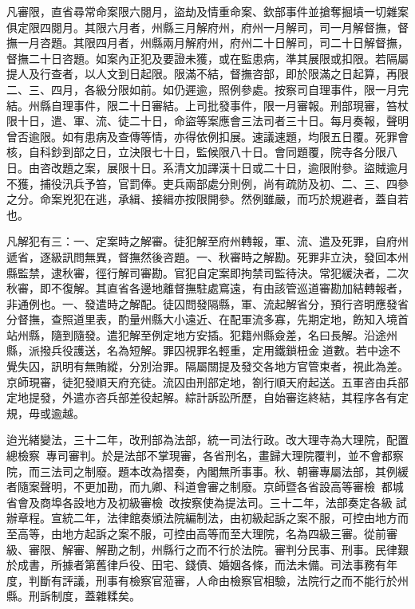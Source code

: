 \begin{pinyinscope}
凡審限，直省尋常命案限六閱月，盜劫及情重命案、欽部事件並搶奪掘墳一切雜案俱定限四閱月。其限六月者，州縣三月解府州，府州一月解司，司一月解督撫，督撫一月咨題。其限四月者，州縣兩月解府州，府州二十日解司，司二十日解督撫，督撫二十日咨題。如案內正犯及要證未獲，或在監患病，準其展限或扣限。若隔屬提人及行查者，以人文到日起限。限滿不結，督撫咨部，即於限滿之日起算，再限二、三、四月，各級分限如前。如仍遲逾，照例參處。按察司自理事件，限一月完結。州縣自理事件，限二十日審結。上司批發事件，限一月審報。刑部現審，笞杖限十日，遣、軍、流、徒二十日，命盜等案應會三法司者三十日。每月奏報，聲明曾否逾限。如有患病及查傳等情，亦得依例扣展。速議速題，均限五日覆。死罪會核，自科鈔到部之日，立決限七十日，監候限八十日。會同題覆，院寺各分限八日。由咨改題之案，展限十日。系清文加譯漢十日或二十日，逾限附參。盜賊逾月不獲，捕役汛兵予笞，官罰俸。吏兵兩部處分則例，尚有疏防及初、二、三、四參之分。命案兇犯在逃，承緝、接緝亦按限開參。然例雖嚴，而巧於規避者，蓋自若也。

凡解犯有三：一、定案時之解審。徒犯解至府州轉報，軍、流、遣及死罪，自府州遞省，逐級訊問無異，督撫然後咨題。一、秋審時之解勘。死罪非立決，發回本州縣監禁，逮秋審，徑行解司審勘。官犯自定案即拘禁司監待決。常犯緩決者，二次秋審，即不復解。其直省各邊地離督撫駐處窵遠，有由該管巡道審勘加結轉報者，非通例也。一、發遣時之解配。徒囚問發隔縣，軍、流起解省分，預行咨明應發省分督撫，查照道里表，酌量州縣大小遠近、在配軍流多寡，先期定地，飭知入境首站州縣，隨到隨發。遣犯解至例定地方安插。犯籍州縣僉差，名曰長解。沿途州縣，派撥兵役護送，名為短解。罪囚視罪名輕重，定用鐵鎖杻金道數。若中途不覺失囚，訊明有無賄縱，分別治罪。隔屬關提及發交各地方官管束者，視此為差。京師現審，徒犯發順天府充徒。流囚由刑部定地，劄行順天府起送。五軍咨由兵部定地提發，外遣亦咨兵部差役起解。綜計訴訟所歷，自始審迄終結，其程序各有定規，毋或逾越。

迨光緒變法，三十二年，改刑部為法部，統一司法行政。改大理寺為大理院，配置總檢察，專司審判。於是法部不掌現審，各省刑名，畫歸大理院覆判，並不會都察院，而三法司之制廢。題本改為摺奏，內閣無所事事。秋、朝審專屬法部，其例緩者隨案聲明，不更加勘，而九卿、科道會審之制廢。京師暨各省設高等審檢，都城省會及商埠各設地方及初級審檢，改按察使為提法司。三十二年，法部奏定各級試辦章程。宣統二年，法律館奏頒法院編制法，由初級起訴之案不服，可控由地方而至高等，由地方起訴之案不服，可控由高等而至大理院，名為四級三審。從前審級、審限、解審、解勘之制，州縣行之而不行於法院。審判分民事、刑事。民律艱於成書，所據者第舊律戶役、田宅、錢債、婚姻各條，而法未備。司法事務有年度，判斷有評議，刑事有檢察官蒞審，人命由檢察官相驗，法院行之而不能行於州縣。刑訴制度，蓋雜糅矣。


\end{pinyinscope}
